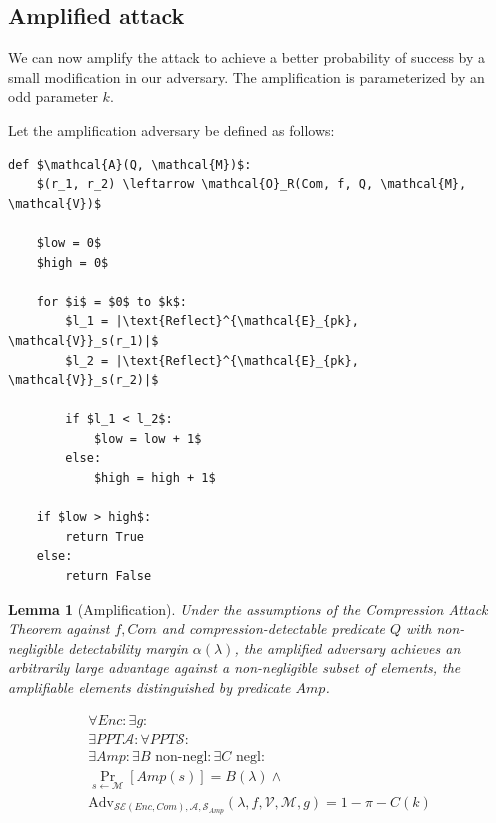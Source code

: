 \documentclass{sig-alternate-05-2015}
\newtheorem{lemma}{Lemma}
\begin{document}
\subsection{Amplified attack}

We can now amplify the attack to achieve a better probability of success by a small modification in our adversary.
The amplification is parameterized by an odd parameter $k$.

Let the amplification adversary be defined as follows:

\begin{lstlisting}[texcl,mathescape]
def $\mathcal{A}(Q, \mathcal{M})$:
    $(r_1, r_2) \leftarrow \mathcal{O}_R(Com, f, Q, \mathcal{M}, \mathcal{V})$

    $low = 0$
    $high = 0$

    for $i$ = $0$ to $k$:
        $l_1 = |\text{Reflect}^{\mathcal{E}_{pk}, \mathcal{V}}_s(r_1)|$
        $l_2 = |\text{Reflect}^{\mathcal{E}_{pk}, \mathcal{V}}_s(r_2)|$

        if $l_1 < l_2$:
            $low = low + 1$
        else:
            $high = high + 1$

    if $low > high$:
        return True
    else:
        return False
\end{lstlisting}

\begin{lemma}[Amplification]

Under the assumptions of the Compression Attack Theorem against $f, Com$
and compression-detectable predicate $Q$ with non-negligible
detectability margin $\alpha(\lambda)$,
the amplified adversary achieves an arbitrarily large advantage
against a non-negligible subset of elements, the
\textit{amplifiable elements} distinguished by predicate $Amp$.

\begin{align*}
    \forall Enc:
    \exists g:\\
    \exists PPT \mathcal{A}:
    \forall PPT \mathcal{S}:\\
    \exists Amp:
    \exists B \text{ non-negl}:
    \exists C \text{ negl}:\\
    \Pr_{s \leftarrow \mathcal{M}}[Amp(s)] = B(\lambda) \land\\
    \text{Adv}_{\mathcal{SE}(Enc, Com), \mathcal{A}, \mathcal{S}_{Amp}}
    (\lambda, f, \mathcal{V}, \mathcal{M}, g) = 1 - \pi - C(k)
\end{align*}

\end{lemma}
\end{document}
